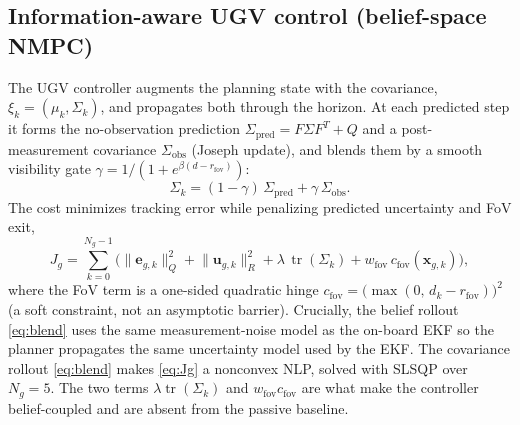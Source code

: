 \documentclass[letterpaper, 10 pt, conference]{ieeeconf}  %
\DeclareMathOperator{\tr}{tr}
\begin{document}
\subsection{Information-aware UGV control (belief-space NMPC)}
The UGV controller augments the planning state with the covariance,
$\xi_k=(\mu_k,\Sigma_k)$, and {propagates both through the horizon}. At each
predicted step it forms the no-observation prediction
$\Sigma_{\mathrm{pred}}=F\Sigma F^T+Q$ and a post-measurement covariance
$\Sigma_{\mathrm{obs}}$ (Joseph update), and blends
them by a smooth visibility gate
$\gamma=1/(1+e^{\beta(d-r_{\mathrm{fov}})})$:
\begin{equation}
\Sigma_k = (1-\gamma)\,\Sigma_{\mathrm{pred}} + \gamma\,\Sigma_{\mathrm{obs}}.
\label{eq:blend}
\end{equation}
The cost minimizes tracking error while penalizing predicted uncertainty and FoV
exit,
\begin{equation}
J_g = \sum_{k=0}^{N_g-1}\!\Big(
\lVert\mathbf{e}_{g,k}\rVert_Q^2
+\lVert\mathbf{u}_{g,k}\rVert_R^2
+\lambda\,\tr(\Sigma_k)
+ w_{\mathrm{fov}}\,c_{\mathrm{fov}}(\mathbf{x}_{g,k})\Big),
\label{eq:Jg}
\end{equation}
where the FoV term is a one-sided quadratic hinge
$c_{\mathrm{fov}}=\big(\max(0,\,d_k-r_{\mathrm{fov}})\big)^2$ (a soft constraint,
not an asymptotic barrier). Crucially, the belief rollout \eqref{eq:blend} uses the
{same} measurement-noise model as the on-board EKF so the planner
propagates the same uncertainty model used by the EKF. The covariance rollout \eqref{eq:blend} makes \eqref{eq:Jg} a nonconvex NLP, solved with SLSQP over $N_g=5$. The two
terms $\lambda\tr(\Sigma_k)$ and $w_{\mathrm{fov}}c_{\mathrm{fov}}$ are what make the
controller belief-coupled and are absent from the passive baseline.
\end{document}
